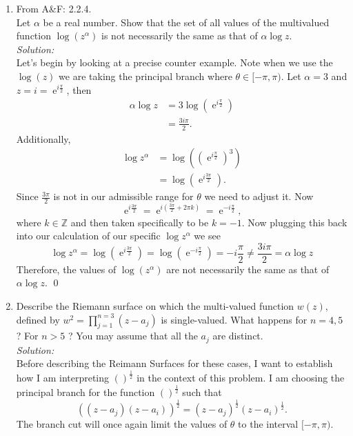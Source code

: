 \documentclass[10pt]{amsart}
\DeclareMathOperator{\E}{e}
\theoremstyle{nonumberplain}
\begin{document}
\begin{enumerate}[label={\bf {\arabic*}:}]
\item From A\&F: 2.2.4. \\
Let $\alpha$ be a real number.
Show that the set of all values of the multivalued function $\log(z^\alpha)$ is not necessarily the same as that of $\alpha \log z$. \\
\textit{Solution:} \\
Let's begin by looking at a precise counter example.
Note when we use the $\log(z)$ we are taking the principal branch where $\theta \in [-\pi, \pi)$.
Let $\alpha = 3$ and $z = i = \E^{i\frac{\pi}{2}}$, then 
\begin{align*}
\alpha \log z &=  3 \log \left( \E^{i\frac{\pi}{2}} \right) \\
&= \frac{3 i \pi}{2}.
\end{align*}
Additionally,
\begin{align*}
\log z^\alpha &=  \log \left( (\E^{i\frac{\pi}{2}})^3 \right) \\
		    &=  \log \left(\E^{i\frac{3\pi}{2}}\right).
\end{align*}
Since $\frac{3\pi}{2}$ is not in our admissible range for $\theta$ we need to adjust it.
Now 
$$
\E^{i\frac{3\pi}{2}} = \E^{i\left(\frac{3\pi}{2} + 2\pi k\right)} =  \E^{-i\frac{\pi}{2}},
$$
where $k \in \mathbb{Z}$ and then taken specifically to be $k=-1$.
Now plugging this back into our calculation of our specific $\log z^\alpha$ we see
$$
\log z^\alpha = \log \left(\E^{i\frac{3\pi}{2}}\right) = \log \left(\E^{-i\frac{\pi}{2}}\right) = -i\frac{\pi}{2} \neq \frac{3 i \pi}{2} = \alpha \log z
$$
Therefore, the values of $\log \left(z^\alpha\right)$ are not necessarily the same as that of $\alpha \log z$.
\qed \\
\item Describe the Riemann surface on which the multi-valued function
  $w(z)$, defined by $w^2=\prod_{j=1}^{n=3}\left(z-a_j\right)$ is
  single-valued. What happens for $n=4,5$ ? For $n>5$ ? You may assume
  that all the $a_j$ are distinct.\\
\textit{Solution:} \\
Before describing the Reimann Surfaces for these cases, I want to establish how I am interpreting $()^\frac{1}{2}$ in the context of this problem.
I am choosing the principal branch for the function $()^\frac{1}{2}$ such that $$\left((z - a_j)(z - a_i)\right)^\frac{1}{2} = (z - a_j)^\frac{1}{2}(z - a_i)^\frac{1}{2}.$$
The branch cut will once again limit the values of $\theta$ to the interval $[-\pi, \pi)$.

\end{enumerate}
\end{document}
